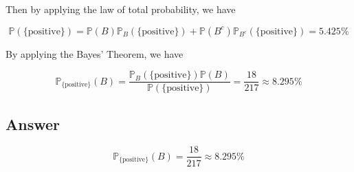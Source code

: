\documentclass[12pt]{article}
\newcommand{\bP}{\mathbb{P}}
\begin{document}
\begin{enumerate}[label={},leftmargin=0in]
			Then by applying the law of total probability, we have
			
			\[\bP(\{\mathrm{positive}\}) = \bP(B)\bP_B(\{\mathrm{positive}\}) + \bP(B^c)\bP_{B^c}(\{\mathrm{positive}\}) = 5.425\%\]
			
			By applying the Bayes’ Theorem, we have
			
			\[
			\bP_{\{\mathrm{positive}\}}(B) = \frac{\bP_B(\{\mathrm{positive}\})\bP(B)}{\bP(\{\mathrm{positive}\})} = \frac{18}{217} \approx 8.295\%
			\]
		
		\subsection*{Answer}
		
			\[\boxed{\bP_{\{\mathrm{positive}\}}(B) = \frac{18}{217} \approx 8.295\%}\]

	\end{enumerate}
	
\end{document}
